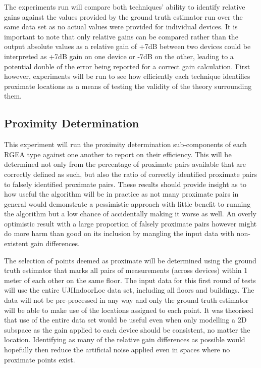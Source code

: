 \documentclass{UoYCSproject}
\begin{document}
            The experiments run will compare both techniques' ability to identify relative gains against the values provided by the ground truth estimator run over the same data set as no actual values were provided for individual devices. It is important to note that only relative gains can be compared rather than the output absolute values as a relative gain of +7dB between two devices could be interpreted as +7dB gain on one device or -7dB on the other, leading to a potential double of the error being reported for a correct gain calculation. First however, experiments will be run to see how efficiently each technique identifies proximate locations as a means of testing the validity of the theory surrounding them.

		    \subsection{Proximity Determination}
            \label{sec:prox_est}
            
                This experiment will run the proximity determination sub-components of each RGEA type against one another to report on their efficiency. This will be determined not only from the percentage of proximate pairs available that are correctly defined as such, but also the ratio of correctly identified proximate pairs to falsely identified proximate pairs. These results should provide insight as to how useful the algorithm will be in practice as not many proximate pairs in general would demonstrate a pessimistic approach with little benefit to running the algorithm but a low chance of accidentally making it worse as well. An overly optimistic result with a large proportion of falsely proximate pairs however might do more harm than good on its inclusion by mangling the input data with non-existent gain differences.
                
                The selection of points deemed as proximate will be determined using the ground truth estimator that marks all pairs of measurements (across devices) within 1 meter of each other on the same floor. The input data for this first round of tests will use the entire UJIIndoorLoc data set, including all floors and buildings. The data will not be pre-processed in any way and only the ground truth estimator will be able to make use of the locations assigned to each point. It was theorised that use of the entire data set would be useful even when only modelling a 2D subspace as the gain applied to each device should be consistent, no matter the location. Identifying as many of the relative gain differences as possible would hopefully then reduce the artificial noise applied even in spaces where no proximate points exist. 
                
\end{document}
